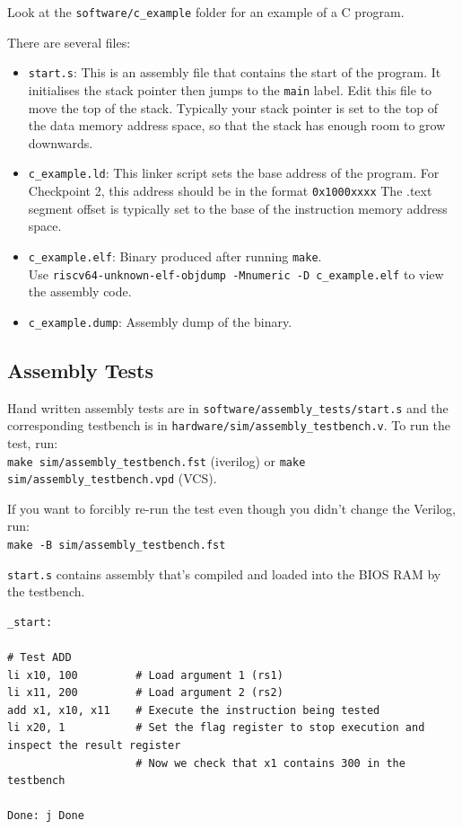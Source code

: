 \documentclass[11pt]{article}
\begin{document}
Look at the \verb|software/c_example| folder for an example of a C program.

There are several files:
\begin{itemize}
    \item \verb|start.s|: This is an assembly file that contains the start of the program.
      It initialises the stack pointer then jumps to the \verb|main| label.
      Edit this file to move the top of the stack.
      Typically your stack pointer is set to the top of the data memory address space, so that the stack has enough room to grow downwards.

    \item \verb|c_example.ld|: This linker script sets the base address of the program.
      For Checkpoint 2, this address should be in the format \verb|0x1000xxxx|
      The .text segment offset is typically set to the base of the instruction memory address space.

    \item \verb|c_example.elf|: Binary produced after running \verb|make|.\\Use \verb|riscv64-unknown-elf-objdump -Mnumeric -D c_example.elf| to view the assembly code.
    \item \verb|c_example.dump|: Assembly dump of the binary.
\end{itemize}

\subsection{Assembly Tests}
\label{assembly_tests}
Hand written assembly tests are in \verb|software/assembly_tests/start.s| and the corresponding testbench is in \verb|hardware/sim/assembly_testbench.v|.
To run the test, run:\\
\verb|make sim/assembly_testbench.fst| (iverilog) or \verb|make sim/assembly_testbench.vpd| (VCS).

If you want to forcibly re-run the test even though you didn't change the Verilog, run:\\
\verb|make -B sim/assembly_testbench.fst|

\verb|start.s| contains assembly that's compiled and loaded into the BIOS RAM by the testbench.
\begin{verbatim}
_start:

# Test ADD
li x10, 100         # Load argument 1 (rs1)
li x11, 200         # Load argument 2 (rs2)
add x1, x10, x11    # Execute the instruction being tested
li x20, 1           # Set the flag register to stop execution and inspect the result register
                    # Now we check that x1 contains 300 in the testbench

Done: j Done
\end{verbatim}
\end{document}
